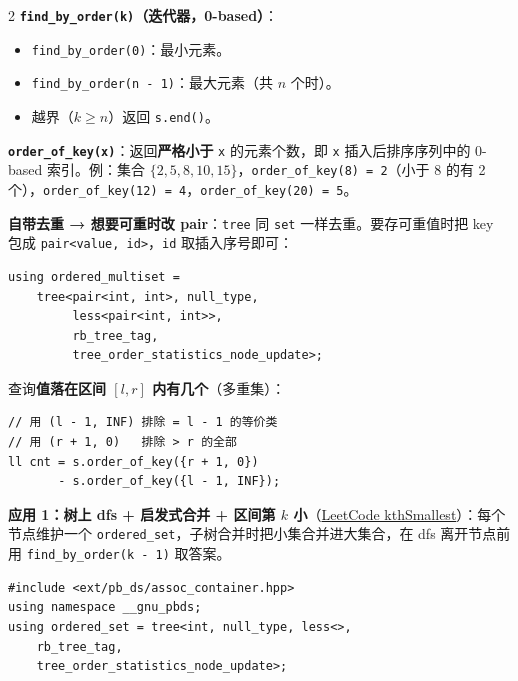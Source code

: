 \begin{multicols*}{2}
		\textbf{\texttt{find\_by\_order(k)}（迭代器，0-based）}：

		\begin{itemize}
			\item \verb|find_by_order(0)|：最小元素。
			\item \verb|find_by_order(n - 1)|：最大元素（共 $n$ 个时）。
			\item 越界（$k \ge n$）返回 \verb|s.end()|。
		\end{itemize}

		\textbf{\texttt{order\_of\_key(x)}}：返回\textbf{严格小于} \verb|x| 的元素个数，即 \verb|x| 插入后排序序列中的 0-based 索引。例：集合 $\{2,5,8,10,15\}$，\verb|order_of_key(8) = 2|（小于 8 的有 2 个），\verb|order_of_key(12) = 4|，\verb|order_of_key(20) = 5|。

		\textbf{自带去重 → 想要可重时改 pair}：\verb|tree| 同 \verb|set| 一样去重。要存可重值时把 key 包成 \verb|pair<value, id>|，\verb|id| 取插入序号即可：

		\begin{verbatim}
using ordered_multiset =
    tree<pair<int, int>, null_type,
         less<pair<int, int>>,
         rb_tree_tag,
         tree_order_statistics_node_update>;
		\end{verbatim}

		查询\textbf{值落在区间 $[l, r]$ 内有几个}（多重集）：

		\begin{verbatim}
// 用 (l - 1, INF) 排除 = l - 1 的等价类
// 用 (r + 1, 0)   排除 > r 的全部
ll cnt = s.order_of_key({r + 1, 0})
       - s.order_of_key({l - 1, INF});
		\end{verbatim}

		\textbf{应用 1：树上 dfs + 启发式合并 + 区间第 $k$ 小}（\href{https://leetcode.cn/problems/kth-smallest-path-xor-sum/}{LeetCode kthSmallest}）：每个节点维护一个 \verb|ordered_set|，子树合并时把小集合并进大集合，在 dfs 离开节点前用 \verb|find_by_order(k - 1)| 取答案。

		\begin{verbatim}
#include <ext/pb_ds/assoc_container.hpp>
using namespace __gnu_pbds;
using ordered_set = tree<int, null_type, less<>,
    rb_tree_tag,
    tree_order_statistics_node_update>;


\end{verbatim}
\end{multicols*}
